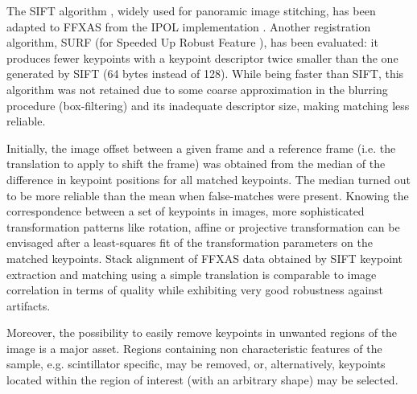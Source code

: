 \documentclass[preprint]{iucr}
\begin{document}
The SIFT algorithm \cite{Lowe99,Lowe04}, widely used for panoramic image
stitching, has been adapted to FFXAS from the IPOL implementation \cite{ASIFT}.
Another registration algorithm, SURF (for Speeded Up Robust Feature
\cite{surf}), has been evaluated: it produces fewer keypoints with a keypoint
descriptor twice smaller than the one generated by SIFT (64 bytes instead of
128).
While being faster than SIFT, this algorithm was not
retained due to some coarse approximation in the blurring procedure
(box-filtering) and its inadequate descriptor size, making matching less
reliable.

Initially, the image offset between a given frame and a reference frame (i.e.
the translation to apply to shift the frame) was obtained from the median
of the difference in keypoint positions for all matched keypoints. The median
turned out to be more reliable than the mean when false-matches were present.
Knowing the correspondence between a set of keypoints in images, more
sophisticated transformation patterns like rotation, affine or projective
transformation can be envisaged after a least-squares fit of the
transformation parameters on the matched keypoints.
Stack alignment of FFXAS data obtained by SIFT keypoint extraction and matching 
using a simple translation is comparable to image correlation in terms of
quality while exhibiting very good robustness against artifacts.

Moreover, the possibility to easily remove keypoints in unwanted regions of
the image is a major asset.
Regions containing non characteristic features of the sample, e.g. scintillator
specific, may be removed, or, alternatively, keypoints located within the
region of interest (with an arbitrary shape) may be selected.
\end{document}
